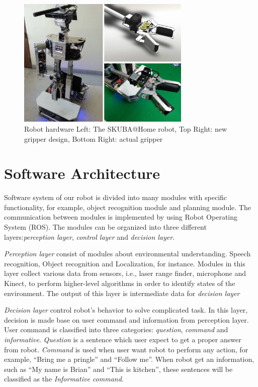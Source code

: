 \documentclass{llncs}
\newcommand{\dq}[1]{``#1''}
\begin{document}
\begin{figure}
\centering
\includegraphics[height=6.2cm]{robot_hardware}
\caption{Robot hardware Left: The SKUBA@Home robot, Top Right: new gripper design, Bottom Right: actual gripper}
\label{fig:base}
\end{figure}

\section{Software Architecture}
Software system of our robot is divided into many modules with specific functionality, for example, object recognition module and planning module. The communication between modules is implemented by using Robot Operating System (ROS). The modules can be organized into three different layers:\textit{perception layer}, \textit{control layer} and \textit{decision layer}.

\textit{Perception layer} consist of modules about environmental understanding. Speech recognition, Object recognition and Localization, for instance. Modules in this layer collect various data from sensors, i.e., laser range finder, microphone and Kinect, to perform higher-level algorithms in order to identify states of the environment. The output of this layer is intermediate data for \textit{decision layer}

\textit{Decision layer} control robot's behavior to solve complicated task. In this layer, decision is made base on user command and information from perception layer. User command is classified into three categories: \textit{question}, \textit{command} and \textit{informative}. \textit{Question} is a sentence which user expect to get a proper answer from robot. \textit{Command} is used when user want robot to perform any action, for example, \dq{Bring me a pringle} and \dq{Follow me}. When robot get an information, such as \dq{My name is Brian} and \dq{This is kitchen}, these sentences will be classified as the \textit{Informative command}.
\end{document}
